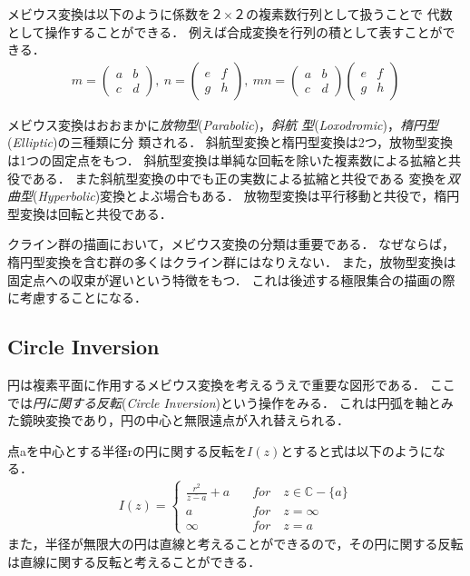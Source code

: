 メビウス変換は以下のように係数を２×２の複素数行列として扱うことで
代数として操作することができる．
例えば合成変換を行列の積として表すことができる．
\begin{align*}
  m = \left(
 \begin{array}{ccc}
  a & b \\
  c & d
 \end{array}
 \right),~
 n = \left(
 \begin{array}{ccc}
  e & f \\
  g & h
 \end{array}
 \right),~
 mn = \left(
 \begin{array}{ccc}
  a & b \\
  c & d
 \end{array}
 \right)
\left(
 \begin{array}{ccc}
  e & f \\
  g & h
 \end{array}
 \right)
\end{align*}

メビウス変換はおおまかに\emph{放物型}(\textit{Parabolic})，\emph{斜航
型}(\textit{Loxodromic})，\emph{楕円型}(\textit{Elliptic})の三種類に分
類される．
斜航型変換と楕円型変換は2つ，放物型変換は1つの固定点をもつ．
斜航型変換は単純な回転を除いた複素数による拡縮と共役である．
また斜航型変換の中でも正の実数による拡縮と共役である
変換を\emph{双曲型}(\textit{Hyperbolic})変換とよぶ場合もある．
放物型変換は平行移動と共役で，楕円型変換は回転と共役である．

クライン群の描画において，メビウス変換の分類は重要である．
なぜならば，楕円型変換を含む群の多くはクライン群にはなりえない．
また，放物型変換は固定点への収束が遅いという特徴をもつ．
これは後述する極限集合の描画の際に考慮することになる．

\subsection{Circle Inversion}

円は複素平面に作用するメビウス変換を考えるうえで重要な図形である．
ここでは\emph{円に関する反転}(\textit{Circle Inversion})という操作をみる．
これは円弧を軸とみた鏡映変換であり，円の中心と無限遠点が入れ替えられる．

点aを中心とする半径rの円に関する反転を$I(z)$とすると式は以下のようになる．
\begin{align*}
I(z) =
 \begin{cases}
  \frac{r^2}{\overline{z - a}} + a \quad &for \quad z \in \mathbb{C} - \{a\} \\
  a \quad &for \quad z = \infty\\
  \infty \quad &for \quad z = a
 \end{cases}
\end{align*}
また，半径が無限大の円は直線と考えることができるので，その円に関する反転
は直線に関する反転と考えることができる．

